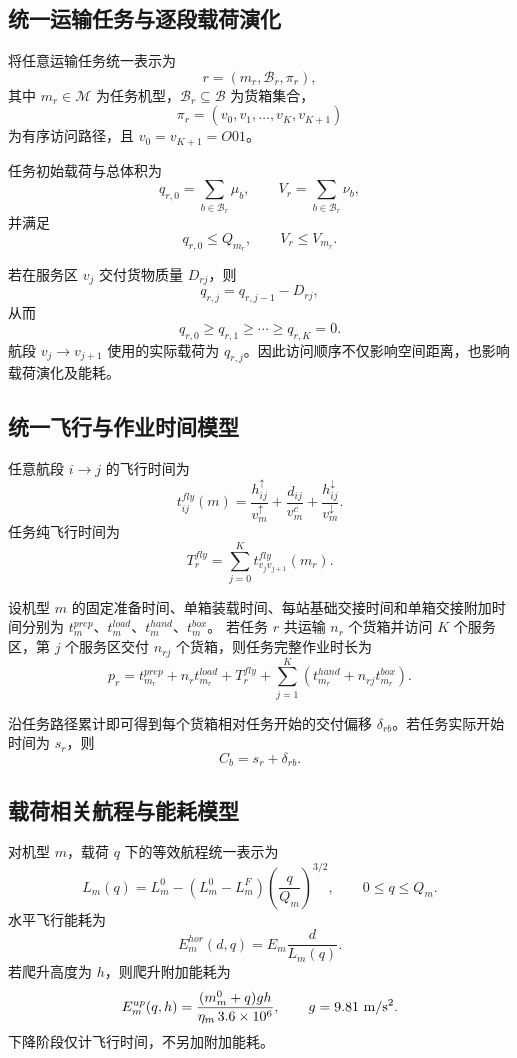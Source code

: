 \documentclass[UTF8,a4paper,12pt]{ctexart}
\begin{document}
\subsection{统一运输任务与逐段载荷演化}

将任意运输任务统一表示为
\[
r=(m_r,\mathcal B_r,\pi_r),
\]
其中 $m_r\in\mathcal M$ 为任务机型，$\mathcal B_r\subseteq\mathcal B$ 为货箱集合，
\[
\pi_r=(v_0,v_1,\ldots,v_K,v_{K+1})
\]
为有序访问路径，且 $v_0=v_{K+1}=O01$。

任务初始载荷与总体积为
\[
q_{r,0}=\sum_{b\in\mathcal B_r}\mu_b,\qquad
V_r=\sum_{b\in\mathcal B_r}\nu_b,
\]
并满足
\[
q_{r,0}\le Q_{m_r},\qquad
V_r\le V_{m_r}.
\]

若在服务区 $v_j$ 交付货物质量 $D_{rj}$，则
\[
q_{r,j}=q_{r,j-1}-D_{rj},
\]
从而
\[
q_{r,0}\ge q_{r,1}\ge\cdots\ge q_{r,K}=0.
\]
航段 $v_j\rightarrow v_{j+1}$ 使用的实际载荷为 $q_{r,j}$。因此访问顺序不仅影响空间距离，也影响载荷演化及能耗。

\subsection{统一飞行与作业时间模型}

任意航段 $i\rightarrow j$ 的飞行时间为
\[
t_{ij}^{fly}(m)
=
\frac{h_{ij}^{\uparrow}}{v_m^{\uparrow}}
+
\frac{d_{ij}}{v_m^c}
+
\frac{h_{ij}^{\downarrow}}{v_m^{\downarrow}}.
\]
任务纯飞行时间为
\[
T_r^{fly}
=
\sum_{j=0}^{K}
t_{v_jv_{j+1}}^{fly}(m_r).
\]

设机型 $m$ 的固定准备时间、单箱装载时间、每站基础交接时间和单箱交接附加时间分别为
$t_m^{prep}$、$t_m^{load}$、$t_m^{hand}$、$t_m^{box}$。
若任务 $r$ 共运输 $n_r$ 个货箱并访问 $K$ 个服务区，第 $j$ 个服务区交付 $n_{rj}$ 个货箱，则任务完整作业时长为
\[
p_r
=
t_{m_r}^{prep}
+
n_rt_{m_r}^{load}
+
T_r^{fly}
+
\sum_{j=1}^{K}
\left(
t_{m_r}^{hand}
+
n_{rj}t_{m_r}^{box}
\right).
\]

沿任务路径累计即可得到每个货箱相对任务开始的交付偏移 $\delta_{rb}$。若任务实际开始时间为 $s_r$，则
\[
C_b=s_r+\delta_{rb}.
\]

\subsection{载荷相关航程与能耗模型}

对机型 $m$，载荷 $q$ 下的等效航程统一表示为
\[
\boxed{
L_m(q)
=
L_m^0
-
(L_m^0-L_m^F)
\left(\frac{q}{Q_m}\right)^{3/2}
},
\qquad 0\le q\le Q_m.
\]
水平飞行能耗为
\[
E_m^{hor}(d,q)
=
E_m\frac{d}{L_m(q)}.
\]
若爬升高度为 $h$，则爬升附加能耗为
\[
E_m^{up}(q,h)
=
\frac{(m_m^0+q)gh}{\eta_m\,3.6\times10^6},
\qquad g=9.81\ {\rm m/s^2}.
\]
下降阶段仅计飞行时间，不另加附加能耗。
\end{document}
